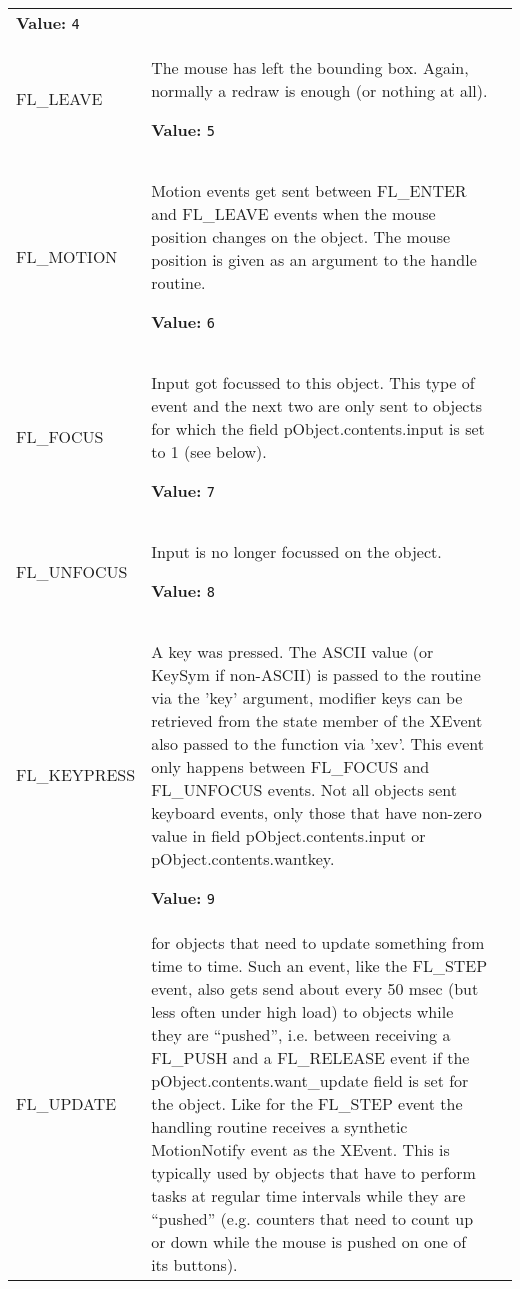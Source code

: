 \begin{longtable}{|p{\varnamewidth}|p{\vardescrwidth}|l}
\textbf{Value:} 
{\tt 4}&\\
\cline{1-2}
\raggedright F\-L\-\_\-L\-E\-A\-V\-E\- & \raggedright The mouse has left the bounding box. Again, normally a redraw is enough
(or nothing at all).

\textbf{Value:} 
{\tt 5}&\\
\cline{1-2}
\raggedright F\-L\-\_\-M\-O\-T\-I\-O\-N\- & \raggedright Motion events get sent between FL\_ENTER and FL\_LEAVE events when the
mouse position changes on the object. The mouse position is given as an
argument to the handle routine.

\textbf{Value:} 
{\tt 6}&\\
\cline{1-2}
\raggedright F\-L\-\_\-F\-O\-C\-U\-S\- & \raggedright Input got focussed to this object. This type of event and the next two
are only sent to objects for which the field pObject.contents.input is set
to 1 (see below).

\textbf{Value:} 
{\tt 7}&\\
\cline{1-2}
\raggedright F\-L\-\_\-U\-N\-F\-O\-C\-U\-S\- & \raggedright Input is no longer focussed on the object.

\textbf{Value:} 
{\tt 8}&\\
\cline{1-2}
\raggedright F\-L\-\_\-K\-E\-Y\-P\-R\-E\-S\-S\- & \raggedright A key was pressed. The ASCII value (or KeySym if non-ASCII) is passed
to the routine via the 'key' argument, modifier keys can be retrieved from
the state member of the XEvent also passed to the function via 'xev'.
This event only happens between FL\_FOCUS and FL\_UNFOCUS events. Not all
objects sent keyboard events, only those that have non-zero value in field
pObject.contents.input or pObject.contents.wantkey.

\textbf{Value:} 
{\tt 9}&\\
\cline{1-2}
\raggedright F\-L\-\_\-U\-P\-D\-A\-T\-E\- & \raggedright for objects that need to update something from time to time. Such an event,
like the FL\_STEP event, also gets send about every 50 msec (but less often
under high load) to objects while they are ``pushed'', i.e. between receiving
a FL\_PUSH and a FL\_RELEASE event if the pObject.contents.want\_update field is
set for the object. Like for the FL\_STEP event the handling routine receives
a synthetic MotionNotify event as the XEvent. This is typically used by
objects that have to perform tasks at regular time intervals while they are
``pushed'' (e.g. counters that need to count up or down while the mouse is
pushed on one of its buttons).


\end{longtable}

